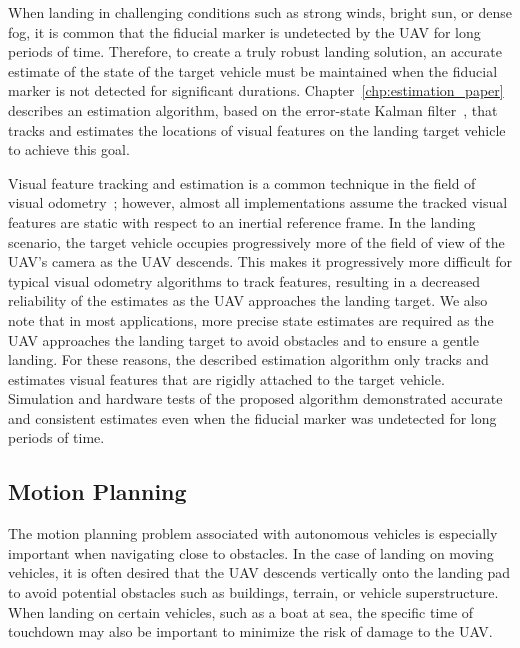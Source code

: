 When landing in challenging conditions such as strong winds, bright sun, or
dense fog, it is common that the fiducial marker is undetected by the UAV
for long periods of time.
Therefore, to create a truly robust landing solution, an accurate estimate of
the state of the target vehicle must be maintained when the fiducial marker is
not detected for significant durations.
Chapter~\ref{chp:estimation_paper}
describes an estimation algorithm, based on the error-state Kalman
filter~\cite{roumeliotis1999circumventing}, that tracks and estimates the locations of
visual features on the landing target vehicle to achieve this goal.

Visual feature
tracking and estimation is a common technique in the field of visual
odometry~\cite{qin2018vins}; however, almost all implementations assume the
tracked visual features are static with respect to an inertial reference frame.
In the landing scenario, the target vehicle occupies progressively more of the
field of view of the UAV's camera as the UAV descends. This makes it progressively
more difficult for typical visual odometry algorithms to track features,
resulting in a decreased
reliability of the estimates as the UAV approaches the landing target.
We also note that in most
applications, more precise state estimates are required as the UAV
approaches
the landing target to avoid obstacles and to ensure a gentle landing.
For these reasons, the described estimation algorithm
only tracks and estimates visual features that are rigidly attached to the
target vehicle.
Simulation and hardware tests of the proposed algorithm demonstrated accurate and consistent estimates
even when the fiducial marker was undetected
for long periods of time.

\subsection{Motion Planning}
The motion planning problem associated with autonomous vehicles is especially
important when 
navigating close to obstacles. In the case of landing on moving vehicles, it is
often desired that the UAV descends vertically onto the landing pad to avoid
potential obstacles such as buildings, terrain, or vehicle superstructure.
When landing on certain vehicles, such as a boat at sea, the specific time of
touchdown may also be important to minimize the risk of damage to the UAV.

